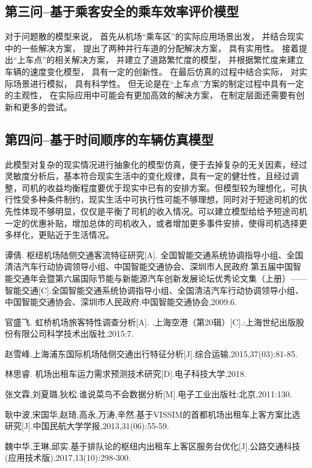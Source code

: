 \documentclass[withoutpreface,bwprint]{cumcmthesis} %
\begin{document}
\subsection{第三问--基于乘客安全的乘车效率评价模型}

对于问题散的模型来说， 首先从机场“乘车区”的实际应用场景出发， 并结合现实中的一些解决方案， 提出了两种并行车道的分配解决方案， 具有实用性。 接着提出“上车点”的相关解决方案， 并建立了道路繁忙度的模型， 并根据繁忙度来建立车辆的速度变化模型， 具有一定的创新性。 在最后仿真的过程中结合实际， 对实际场景进行模拟， 具有科学性。 但无论是在“上车点”方案的制定过程中具有一定的主观性， 在实际应用中可能会有更加高效的解决方案， 在制定层面还需要有创新和更多的尝试。


\subsection{第四问--基于时间顺序的车辆仿真模型}
此模型对复杂的现实情况进行抽象化的模型仿真，便于去掉复杂的无关因素，经过灵敏度分析后，基本符合现实生活中的变化规律，具有一定的健壮性，且经过调整，司机的收益均衡程度要优于现实中已有的安排方案。但模型较为理想化，可执行性受多种条件制约，现实生活中可执行性可能不够理想，同时对于短途司机的优先性体现不够明显，仅仅是平衡了司机的收入情况。可以建立模型给给予短途司机一定的优惠补贴，增加总体的司机收入，或者增加更多事件安排，使得司机选择更多样化，更贴近于生活情况。



\newpage
\begin{thebibliography}{9}%
	 谭倩. 枢纽机场陆侧交通客流特征研究[A]. 全国智能交通系统协调指导小组、全国清洁汽车行动协调领导小组、中国智能交通协会、深圳市人民政府.第五届中国智能交通年会暨第六届国际节能与新能源汽车创新发展论坛优秀论文集（上册）——智能交通[C].全国智能交通系统协调指导小组、全国清洁汽车行动协调领导小组、中国智能交通协会、深圳市人民政府:中国智能交通协会,2009:6.

	 官盛飞. 虹桥机场旅客特性调查分析[A]. .上海空港（第20辑）[C].:上海世纪出版股份有限公司科学技术出版社,2015:7.

    赵雪峰.上海浦东国际机场陆侧交通出行特征分析[J].综合运输,2015,37(03):81-85.

 	 林思睿. 机场出租车运力需求预测技术研究[D].电子科技大学,2018.

	 张文霖,刘夏璐,狄松.谁说菜鸟不会数据分析[M].电子工业出版社:北京,2011:130.


	 耿中波,宋国华,赵琦,高永,万涛,辛然.基于VISSIM的首都机场出租车上客方案比选研究[J].中国民航大学学报,2013,31(06):55-59.

     魏中华,王琳,邱实.基于排队论的枢纽内出租车上客区服务台优化[J].公路交通科技(应用技术版),2017,13(10):298-300.



\end{thebibliography}
\newpage
\appendix
\end{document}
